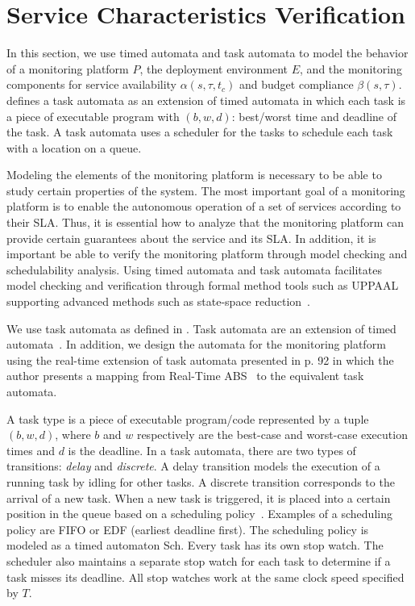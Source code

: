 
\section{Service Characteristics Verification}
\label{ch04:sec:timed:fsm}

In this section, we use timed automata and task automata to model the behavior of a monitoring platform $P$, the deployment environment $E$, and the monitoring components for service availability $\alpha(s,\tau,t_c)$ and budget compliance $\beta(s,\tau)$. 
\cite{jaghoori2010time} defines a task automata as an extension of timed automata in which each task is a piece of executable program with $(b,w,d)$: best/worst time and deadline of the task. A task automata uses a scheduler for the tasks to schedule each task with a location on a queue.
% 

Modeling the elements of the monitoring platform is necessary to be able to study certain properties of the system.
The most important goal of a monitoring platform is to enable the autonomous operation of a set of services according to their SLA.
Thus, it is essential how to analyze that the monitoring platform can provide certain guarantees about the service and its SLA.
In addition, it is important be able to verify the monitoring platform through model checking and schedulability analysis.
Using timed automata and task automata facilitates model checking and verification through formal method tools such as UPPAAL~\cite{uppaal2004} supporting advanced methods such as state-space reduction~\cite{larsen1997efficient}. 
   
We use task automata as defined in \cite{fersman2007task,jaghoori2012composing,jaghoori2010time}.
Task automata are an extension of timed automata~\cite{alur:1994:timedautomata}.
In addition, we design the automata for the monitoring platform using the real-time extension of task automata presented in \cite{jaghoori2010time} p. 92 in which the author presents a mapping from Real-Time ABS~\cite{johnsen2012modeling} to the equivalent task automata.

A task type is a piece of executable program/code represented by a tuple $(b,w,d)$, where $b$ and $w$ respectively are the best-case and worst-case execution times and $d$ is the deadline.
In a task automata, there are two types of transitions: \emph{delay} and \emph{discrete}.
A delay transition models the execution of a running task by idling for other tasks.
A discrete transition corresponds to the arrival of a new task.
When a new task is triggered, it is placed into a certain position in the queue based on a scheduling policy~\cite{Nobakht:sched,nobakht2013future}.
Examples of a scheduling policy are \textsf{FIFO} or \textsf{EDF} (earliest deadline first).
The scheduling policy is modeled as a timed automaton \textsf{Sch}.
Every task has its own stop watch.
The scheduler also maintains a separate stop watch for each task to determine if a task misses its deadline.
All stop watches work at the same clock speed specified by $T$.

